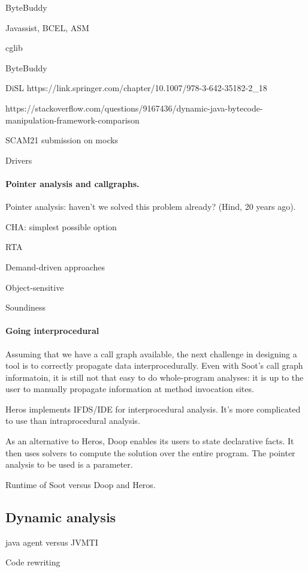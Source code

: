 ByteBuddy

Javassist, BCEL, ASM

cglib

ByteBuddy


DiSL https://link.springer.com/chapter/10.1007/978-3-642-35182-2_18

https://stackoverflow.com/questions/9167436/dynamic-java-bytecode-manipulation-framework-comparison



SCAM21 submission on mocks


Drivers

\paragraph{Pointer analysis and callgraphs.}

Pointer analysis: haven't we solved this problem already? (Hind, 20 years ago).

CHA: simplest possible option

RTA

Demand-driven approaches

Object-sensitive

Soundiness

\paragraph{Going interprocedural}
Assuming that we have a call graph available, the next challenge in
designing a tool is to correctly propagate data interprocedurally.
Even with Soot's call graph informatoin, it is still not that easy to
do whole-program analyses: it is up to the user to manually propagate
information at method invocation sites.

Heros implements IFDS/IDE for interprocedural analysis.
It's more complicated to use than intraprocedural analysis.

As an alternative to Heros, Doop enables its users to state
declarative facts. It then uses solvers to compute the solution over the
entire program. The pointer analysis to be used is a parameter.

Runtime of Soot versus Doop and Heros.


\subsection{Dynamic analysis}

java agent versus JVMTI

Code rewriting

